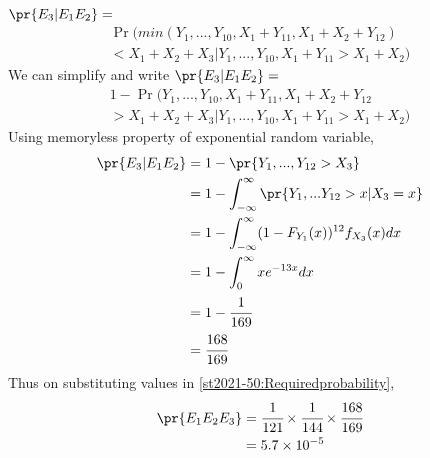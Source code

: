 $\pr{E_3|E_1E_2} = $  
\begin{multline}
    \Pr(min(Y_1,...,Y_{10},X_1+Y_{11},X_1+X_2+Y_{12}) \\
    < X_1+X_2+X_3| Y_1,...,Y_{10},X_1+Y_{11} > X_1+X_2)
\end{multline}
We can simplify and write $\pr{E_3|E_1E_2} = $
\begin{multline}
    1 - \Pr(Y_1,...,Y_{10},X_1+Y_{11},X_1+X_2+Y_{12} \\
    > X_1+X_2+X_3| Y_1,...,Y_{10},X_1+Y_{11} > X_1+X_2)
\end{multline}
Using memoryless property of exponential random variable,
\begin{align}
    \pr{E_3|E_1E_2} &= 1 - \pr{Y_1,...,Y_{12} > X_3}\\
                    &= 1 - \int_{-\infty}^{\infty} \pr{Y_1,...Y_{12} > x|X_3 = x}\\
                    &= 1 - \int_{-\infty}^{\infty} (1-F_{Y_1}(x))^{12} f_{X_3}(x)dx\\
                    &= 1 - \int_{0}^{\infty} x e^{-13x} dx\\
                    &= 1 - \cfrac{1}{169}\\
                    &= \cfrac{168}{169}
\end{align}
Thus on substituting values in \eqref{st2021-50:Requiredprobability}, 
\begin{align}
    \pr{E_1E_2E_3} &= \cfrac{1}{121}\times \cfrac{1}{144}\times \cfrac{168}{169}\\
                   &= 5.7 \times 10^{-5}
\end{align}